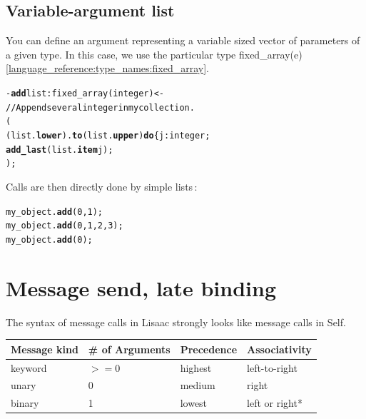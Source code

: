 \documentclass[11pt]{mybook}
\begin{document}
\subsection{Variable-argument list}
\label{language_reference:slot_descriptors:variable_argument}
%
You can define an argument representing a variable sized vector of parameters of a given type.
In this case, we use the particular type {\sc{}fixed\_array(e)} 
\ref{language_reference:type_names:fixed_array}.

\begin{alltt} 
    - {\bf{}add} list:{\sc{}fixed\_array(integer)} <-
      // Append several integer in my collection.
      ( 
        (list.{\bf{}lower}).{\bf{}to} (list.{\bf{}upper}) {\bf{}do} \{ j:{\sc{}integer};
          {\bf{}add\_last} (list.{\bf{}item} j);
      );
\end{alltt}

Calls are then directly done by simple lists\,:

\begin{alltt} 
    my\_object.{\bf{}add} (0,1);
    my\_object.{\bf{}add} (0,1,2,3);
    my\_object.{\bf{}add} (0);
\end{alltt}

\section{Message send, late binding}
\label{language_reference:late_binding}
%
The syntax of message calls in Lisaac strongly looks like message calls in
Self.

\noindent
\begin{tabularx}{\textwidth}{X X X X}
\hline
{\bf{}Message kind} & {\bf{}\# of Arguments} & {\bf{}Precedence} & {\bf{}Associativity} \\
\hline
\hline
{keyword}     & {$>=$0}          & {highest}          & {left-to-right}      \\
\hline
{unary}       & {0}              & {medium}           & {right}              \\
\hline
{binary}      & {1}              & {lowest}           & {left or right*}     \\
\hline
\end{tabularx}
\end{document}
